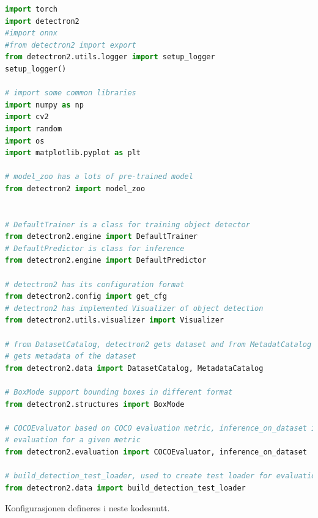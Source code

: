 \begin{lstlisting}[language=Python, caption=Her lastes bibliotekene inn i train.py for detectron2]
import torch
import detectron2
#import onnx
#from detectron2 import export
from detectron2.utils.logger import setup_logger
setup_logger()

# import some common libraries
import numpy as np
import cv2
import random
import os
import matplotlib.pyplot as plt

# model_zoo has a lots of pre-trained model
from detectron2 import model_zoo


# DefaultTrainer is a class for training object detector
from detectron2.engine import DefaultTrainer
# DefaultPredictor is class for inference
from detectron2.engine import DefaultPredictor

# detectron2 has its configuration format
from detectron2.config import get_cfg
# detectron2 has implemented Visualizer of object detection
from detectron2.utils.visualizer import Visualizer

# from DatasetCatalog, detectron2 gets dataset and from MetadatCatalog it
# gets metadata of the dataset
from detectron2.data import DatasetCatalog, MetadataCatalog

# BoxMode support bounding boxes in different format
from detectron2.structures import BoxMode

# COCOEvaluator based on COCO evaluation metric, inference_on_dataset is used for
# evaluation for a given metric
from detectron2.evaluation import COCOEvaluator, inference_on_dataset

# build_detection_test_loader, used to create test loader for evaluation
from detectron2.data import build_detection_test_loader

\end{lstlisting}

Konfigurasjonen defineres i neste kodesnutt.

